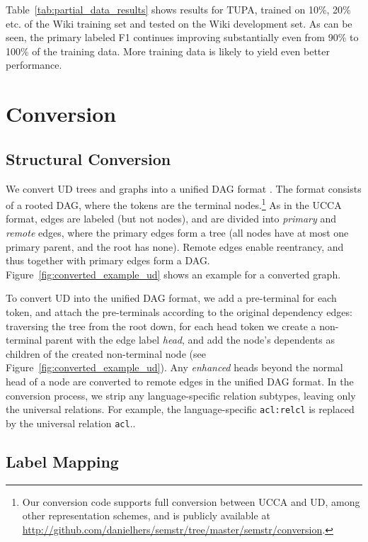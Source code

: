 \documentclass[11pt,a4paper]{article}
\begin{document}
Table~\ref{tab:partial_data_results} shows results for TUPA,
trained on 10\%, 20\% etc. of the Wiki training set and tested on the Wiki development set.
As can be seen, the primary labeled F1 continues improving substantially even from 90\% to 100\%
of the training data. More training data is likely to yield even better performance.

\section{Conversion}\label{sec:conversion}

\subsection{Structural Conversion}\label{sec:structural}

We convert UD trees and graphs into a unified DAG format \cite{hershcovich2018multitask,hershcovich2018universal}.
The format consists of a rooted DAG, where the tokens are the terminal
nodes.\footnote{Our conversion code supports full conversion between UCCA and UD,
among other representation schemes,
and is publicly available at \url{http://github.com/danielhers/semstr/tree/master/semstr/conversion}.}
As in the UCCA format, edges are labeled (but not nodes),
and are divided into \textit{primary} and \textit{remote} edges,
where the primary edges form a tree (all nodes have at most one primary parent,
and the root has none).
Remote edges enable reentrancy, and thus together with primary edges
form a DAG.
Figure~\ref{fig:converted_example_ud} shows an example for a converted graph.

To convert UD into the unified DAG format,
we add a pre-terminal for each token,
and attach the pre-terminals according to the original dependency edges:
traversing the tree from the root down, for each head token we create a non-terminal
parent with the edge label {\it head},
and add the node's dependents as children of the created non-terminal node
(see Figure~\ref{fig:converted_example_ud}).
Any \textit{enhanced}
heads beyond the normal head of a node are converted to remote edges in the unified DAG format.
In the conversion process, we strip any language-specific relation subtypes,
leaving only the universal relations.
For example, the language-specific \verb|acl:relcl| is replaced by the universal relation \verb|acl|..



\subsection{Label Mapping}\label{sec:mapping}
\end{document}
